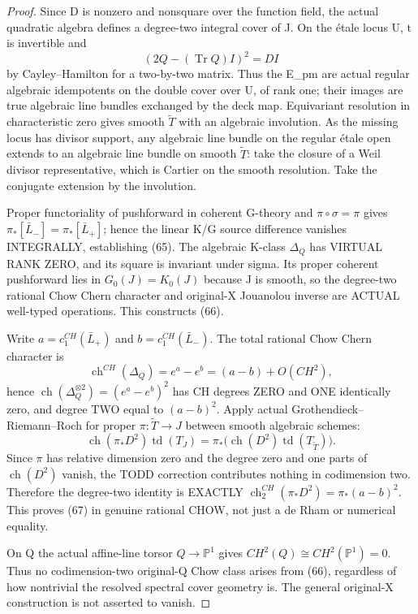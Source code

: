 \documentclass[11pt]{article}
\begin{document}
\begin{proof}
Since D is nonzero and nonsquare
over the function field, the
actual quadratic algebra defines
a degree-two integral cover of J.
On the étale locus U, t is
invertible and
\[
 (2Q-(\operatorname{Tr}Q)I)^2
   = D I
\]
by Cayley--Hamilton for a
two-by-two matrix. Thus the E_pm
are actual regular algebraic
idempotents on the double cover
over U, of rank one; their images
are true algebraic line bundles
exchanged by the deck map.
Equivariant resolution in
characteristic zero gives smooth
$\widetilde T$ with an algebraic
involution. As the missing
locus has divisor support,
any algebraic line bundle on
the regular étale open extends
to an algebraic line bundle on
smooth $\widetilde T$: take the
closure of a Weil divisor
representative, which is
Cartier on the smooth resolution.
Take the conjugate extension
by the involution.

Proper functoriality of
pushforward in coherent G-theory
and $\pi\circ\sigma=\pi$ gives
$\pi_*[\bar L_-]=
  \pi_*[\bar L_+]$;
hence the linear K/G source
difference vanishes INTEGRALLY,
establishing (65). The algebraic
K-class $\Delta_Q$ has VIRTUAL
RANK ZERO, and its square is
invariant under sigma. Its
proper coherent pushforward
lies in $G_0(J)=K_0(J)$ because
J is smooth, so the
degree-two rational Chow
Chern character and original-X
Jouanolou inverse are ACTUAL
well-typed operations.
This constructs (66).

Write $a=c_1^{CH}(\bar L_+)$
and $b=c_1^{CH}(\bar L_-)$.
The total rational Chow
Chern character is
\[
 \operatorname{ch}^{CH}(\Delta_Q)
   =e^a-e^b=(a-b)+O(CH^2),
\]
hence
$\operatorname{ch}(\Delta_Q^{\otimes2})
=(e^a-e^b)^2$ has CH degrees
ZERO and ONE identically zero,
and degree TWO equal to
$(a-b)^2$.
Apply actual Grothendieck--
Riemann--Roch for proper
$\pi:\widetilde T\to J$
between smooth algebraic schemes:
\[
 \operatorname{ch}(\pi_*D^2)
       \operatorname{td}(T_J)
  =\pi_*\bigl(
       \operatorname{ch}(D^2)
       \operatorname{td}(T_{\widetilde T})
          \bigr).
\]
Since $\pi$ has relative
dimension zero and the
degree zero and one parts of
$\operatorname{ch}(D^2)$ vanish,
the TODD correction contributes
nothing in codimension two.
Therefore the degree-two
identity is EXACTLY
$\operatorname{ch}^{CH}_2
        (\pi_*D^2)=\pi_*(a-b)^2$.
This proves (67) in
genuine rational CHOW, not
just a de Rham or numerical
equality.

On Q the actual affine-line
torsor $Q\to\mathbb P^1$
gives
$CH^2(Q)\cong CH^2(\mathbb P^1)=0$.
Thus no codimension-two
original-Q Chow class arises
from (66), regardless of how
nontrivial the resolved
spectral cover geometry is.
The general original-X
construction is not asserted
to vanish.
\end{proof}
\end{document}
